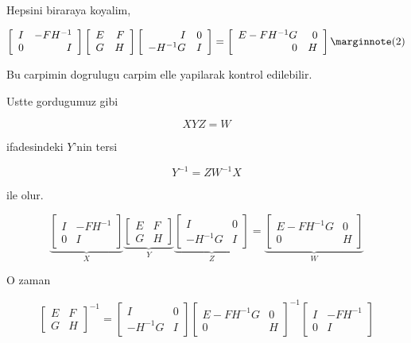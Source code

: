 \documentclass[12pt,fleqn]{article}\usepackage{../common}
\begin{document}
Hepsini biraraya koyalim, 

\[ 
\left[\begin{array}{rr}
I & -FH^{-1} \\
0 & I
\end{array}\right] 
\left[\begin{array}{rr}
E & F \\
G & H
\end{array}\right] 
\left[\begin{array}{rr}
I & 0 \\
-H^{-1}G & I
\end{array}\right] 
= 
\left[\begin{array}{rr}
E-FH^{-1}G & 0 \\
0 & H
\end{array}\right] 
\mlabel{2}
 \]

Bu carpimin dogrulugu carpim elle yapilarak kontrol edilebilir.

Ustte gordugumuz gibi 

\[ XYZ = W \]

ifadesindeki $Y$'nin tersi 

\[ Y^{-1} = ZW^{-1}X \]

ile olur. 

\[ 
\underbrace{
\left[\begin{array}{rr}
I & -FH^{-1} \\
0 & I
\end{array}\right] 
}_{X}
\underbrace{
\left[\begin{array}{rr}
E & F \\
G & H
\end{array}\right] 
}_{Y}
\underbrace{
\left[\begin{array}{rr}
I & 0 \\
-H^{-1}G & I
\end{array}\right] 
}_{Z}
= 
\underbrace{
\left[\begin{array}{rr}
E-FH^{-1}G & 0 \\
0 & H
\end{array}\right] 
}_{W}
 \]


O zaman 

\[ 
\left[\begin{array}{rr}
E & F \\
G & H
\end{array}\right]^{-1}
=
\left[\begin{array}{rr}
I & 0 \\
-H^{-1}G & I
\end{array}\right] 
\left[\begin{array}{rr}
E-FH^{-1}G & 0 \\
0 & H
\end{array}\right]^{-1}
\left[\begin{array}{rr}
I & -FH^{-1} \\
0 & I
\end{array}\right] 
 \]
\end{document}
